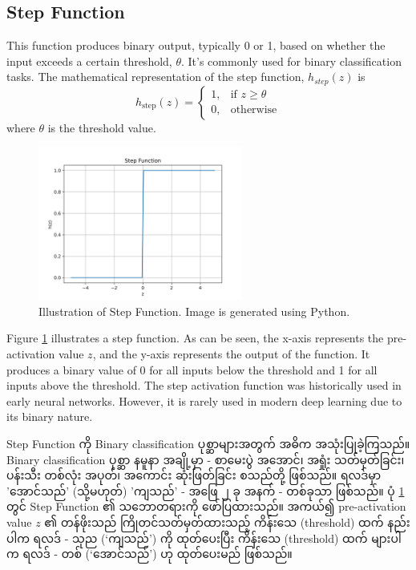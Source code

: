 \subsection{Step Function}\label{sec:activation}
This function produces binary output, typically 0 or 1, based on whether the input exceeds a certain threshold, $\theta$. It's commonly used for binary classification tasks. The mathematical representation of the step function, $h_{step}(z)$ is 
      \begin{equation}\label{eqn:step}
            h_{\text{step}}(z) = 
                                        \begin{cases}
                                        1, & \text{if } z \geq \theta \\
                                        0, & \text{otherwise}
                                        \end{cases}
    \end{equation} where $\theta$ is the threshold value. 
    
\begin{figure}[h]%
\centering
\includegraphics[width=0.6\textwidth]{imgs/step_fun.png}
\caption{Illustration of Step Function. Image is generated using Python.}\label{fig:step}
\end{figure}

Figure \ref{fig:step} illustrates a step function. As can be seen, the x-axis represents the pre-activation value $z$, and the y-axis represents the output of the function. It produces a binary value of 0 for all inputs below the threshold and 1 for all inputs above the threshold. The step activation function was historically used in early neural networks. However, it is rarely used in modern deep learning due to its binary nature.

\vspace{0.5em} 
Step Function ကို Binary classification ပုစ္ဆာများအတွက် အဓိက အသုံးပြုခဲ့ကြသည်။ Binary classification ပုစ္ဆာ နမူနာ အချို့မှာ - စာမေးပွဲ အအောင်၊ အရှုံး သတ်မှတ်ခြင်း၊ ပန်းသီး တစ်လုံး အပုတ်၊ အကောင်း ဆုံးဖြတ်ခြင်း စသည်တို့ ဖြစ်သည်။ ရလဒ်မှာ 'အောင်သည်' (သို့မဟုတ်) 'ကျသည်' - အဖြေ ၂ ခု အနက် - တစ်ခုသာ ဖြစ်သည်။ ပုံ  \ref{fig:step} တွင် Step Function ၏ သဘောတရားကို ဖော်ပြထားသည်။ အကယ်၍ pre-activation value $z$ ၏ တန်ဖိုးသည် ကြိုတင်သတ်မှတ်ထားသည့် ကိန်းသေ (threshold) ထက် နည်းပါက ရလဒ် - သုည (`ကျသည်') ကို ထုတ်ပေးပြီး ကိန်းသေ (threshold) ထက် များပါက ရလဒ် - တစ် (`အောင်သည်') ဟု ထုတ်ပေးမည် ဖြစ်သည်။ 

